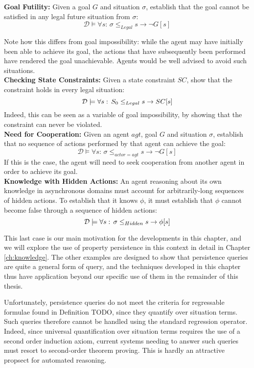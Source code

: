 \textbf{Goal Futility:} Given a goal $G$ and situation $\sigma$,
establish that the goal cannot be satisfied in any legal future situation
from $\sigma$:\[
\mathcal{D}\models\forall s:\,\sigma\leq_{Legal}s\rightarrow\neg G[s]\]


Note how this differs from goal impossibility: while the agent may
have initially been able to achieve its goal, the actions that have
subsequently been performed have rendered the goal unachievable. Agents
would be well advised to avoid such situations.\\


\textbf{Checking State Constraints:} Given a state constraint $SC$,
show that the constraint holds in every legal situation:\[
\mathcal{D}\models\forall s:\, S_{0}\leq_{Legal}s\rightarrow SC[s]\]
 Indeed, this can be seen as a variable of goal impossibility, by
showing that the constraint can never be violated.\\


\textbf{Need for Cooperation:} Given an agent $agt$, goal $G$ and
situation $\sigma$, establish that no sequence of actions performed
by that agent can achieve the goal:\[
\mathcal{D}\models\forall s:\,\sigma\leq_{actor=agt}s\rightarrow\neg G[s]\]
 If this is the case, the agent will need to seek cooperation from
another agent in order to achieve its goal.\\


\textbf{Knowledge with Hidden Actions:} An agent reasoning about its
own knowledge in asynchronous domains must account for arbitrarily-long
sequences of hidden actions. To establish that it knows $\phi$, it
must establish that $\phi$ cannot become false through a sequence
of hidden actions:\[
\mathcal{D}\models\forall s:\,\sigma\leq_{Hidden}s\rightarrow\phi[s]\]


This last case is our main motivation for the developments in this
chapter, and we will explore the use of property persistence in this
context in detail in Chapter \ref{ch:knowledge}. The other examples
are designed to show that persistence queries are quite a general
form of query, and the techniques developed in this chapter thus have
application beyond our specific use of them in the remainder of this
thesis.

Unfortunately, persistence queries do not meet the criteria for regressable
formulae found in Definition TODO, since they quantify over situation
terms. Such queries therefore cannot be handled using the standard
regression operator. Indeed, since universal quantification over situation
terms requires the use of a second order induction axiom, current
systems needing to answer such queries must resort to second-order
theorem proving. This is hardly an attractive propsect for automated
reasoning.



